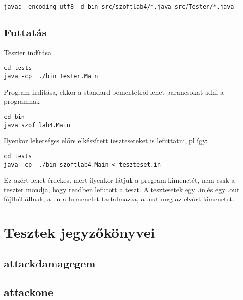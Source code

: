 \lstset{escapeinside=`', xleftmargin=10pt, frame=single, basicstyle=\ttfamily\footnotesize, language=sh}
\begin{lstlisting}
javac -encoding utf8 -d bin src/szoftlab4/*.java src/Tester/*.java
\end{lstlisting}

\subsection{Futtatás}

\lstset{escapeinside=`', xleftmargin=10pt, frame=single, basicstyle=\ttfamily\footnotesize, language=sh}
Teszter indítása
\begin{lstlisting}
cd tests
java -cp ../bin Tester.Main
\end{lstlisting}

Program indítása, ekkor a standard bementetről lehet parancsokat adni a programnak
\begin{lstlisting}
cd bin
java szoftlab4.Main
\end{lstlisting}

Ilyenkor lehetséges előre elkészített teszteseteket is lefuttatni, pl így:
\begin{lstlisting}
cd tests
java -cp ../bin szoftlab4.Main < teszteset.in
\end{lstlisting}
Ez azért lehet érdekes, mert ilyenkor látjuk a program kimenetét, nem csak a teszter mondja, hogy rendben lefutott a teszt.
A tesztesetek egy .in és egy .out fájlból állnak, a .in a bemenetet tartalmazza, a .out meg az elvárt kimenetet.

\section{Tesztek jegyzőkönyvei}

\subsection{attackdamagegem}


\subsection{attackone}



